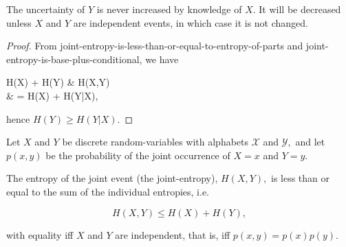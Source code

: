 \documentclass{article}
\begin{document}
\begin{theorem}
The \@{uncertainty} of $Y$ is never increased by knowledge of $X.$ It will be decreased unless $X$ and $Y$ are independent events, in which case it is not changed.
\end{theorem}

\begin{proof}
From \@{joint-entropy-is-less-than-or-equal-to-entropy-of-parts} and \@{joint-entropy-is-base-plus-conditional}, we have

\bal
H(X) + H(Y) & \geq H(X,Y) \\
            & = H(X) + H(Y|X), \\ 
\eal

hence $H(Y) \geq H(Y|X).$
\end{proof}

\begin{theorem}\label{joint-entropy-is-less-than-or-equal-to-entropy-of-parts}
Let $X$ and $Y$ be discrete \@{random-variables} with alphabets $\mathcal{X}$ and $\mathcal{Y},$ and let $p(x,y)$ be the probability of the joint occurrence of $X = x$ and $Y = y.$

	The \@{entropy} of the joint event (the \@{joint-entropy}), $H(X,Y),$ is less than or equal to the sum of the individual entropies, i.e.

\[ H(X,Y) \leq H(X) + H(Y), \]

with equality iff $X$ and $Y$ are independent, that is, iff $p(x,y) = p(x)p(y).$
\end{theorem}
\end{document}
